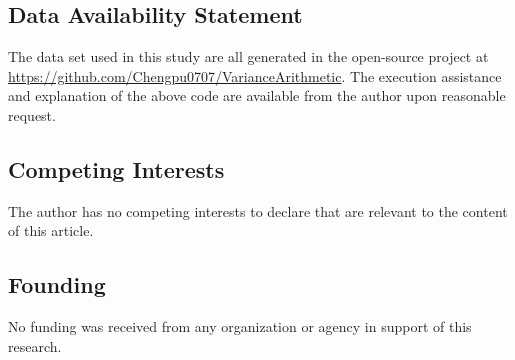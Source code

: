 \documentclass[twoside]{article}
\numberwithin{equation}{section}
\newcommand{\Verbose}{}
\begin{document}
\subsection{Data  Availability Statement}

The data set used in this study are all generated in the open-source project at \url{https://github.com/Chengpu0707/VarianceArithmetic}. 
The execution assistance and explanation of the above code are available from the author upon reasonable request.


\subsection{Competing Interests}

The author has no competing interests to declare that are relevant to the content of this article.

\subsection{Founding}

No funding was received from any organization or agency in support of this research.


\ifdefined\Verbose
\clearpage
\fi
\ifdefined\ManualReference
\end{document}
